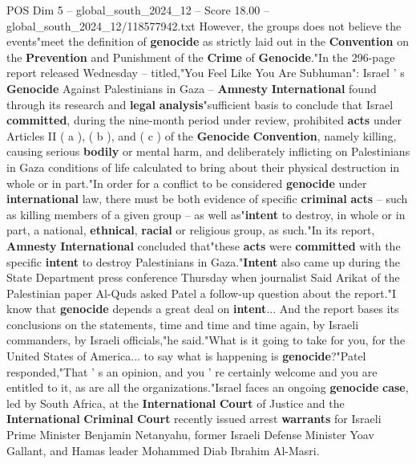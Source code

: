 \begin{textsample}{POS Dim 5 – global\_south\_2024\_12 – Score 18.00 – global\_south\_2024\_12/118577942.txt}
However, the groups does not believe the events"meet the definition of \textbf{genocide} as strictly laid out in the \textbf{Convention} on the \textbf{Prevention} and Punishment of the \textbf{Crime} of \textbf{Genocide}."In the 296-page report released Wednesday -- titled,"You Feel Like You Are Subhuman": Israel ' s \textbf{Genocide} Against Palestinians in Gaza -- \textbf{Amnesty} \textbf{International} found through its research and \textbf{legal} \textbf{analysis}"sufficient basis to conclude that Israel \textbf{committed}, during the nine-month period under review, prohibited \textbf{acts} under Articles II ( a ), ( b ), and ( c ) of the \textbf{Genocide} \textbf{Convention}, namely killing, causing serious \textbf{bodily} or mental harm, and deliberately inflicting on Palestinians in Gaza conditions of life calculated to bring about their physical destruction in whole or in part."In order for a conflict to be considered \textbf{genocide} under \textbf{international} law, there must be both evidence of specific \textbf{criminal} \textbf{acts} -- such as killing members of a given group -- as well as"\textbf{intent} to destroy, in whole or in part, a national, \textbf{ethnical}, \textbf{racial} or religious group, as such."In its report, \textbf{Amnesty} \textbf{International} concluded that"these \textbf{acts} were \textbf{committed} with the specific \textbf{intent} to destroy Palestinians in Gaza."\textbf{Intent} also came up during the State Department press conference Thursday when journalist Said Arikat of the Palestinian paper Al-Quds asked Patel a follow-up question about the report."I know that \textbf{genocide} depends a great deal on \textbf{intent}...
And the report bases its conclusions on the statements, time and time and time again, by Israeli commanders, by Israeli officials,"he said."What is it going to take for you, for the United States of America... to say what is happening is \textbf{genocide}?"Patel responded,"That ' s an opinion, and you ' re certainly welcome and you are entitled to it, as are all the organizations."Israel faces an ongoing \textbf{genocide} \textbf{case}, led by South Africa, at the \textbf{International} \textbf{Court} of Justice and the \textbf{International} \textbf{Criminal} \textbf{Court} recently issued arrest \textbf{warrants} for Israeli Prime Minister Benjamin Netanyahu, former Israeli Defense Minister Yoav Gallant, and Hamas leader Mohammed Diab Ibrahim Al-Masri.

\end{textsample}
